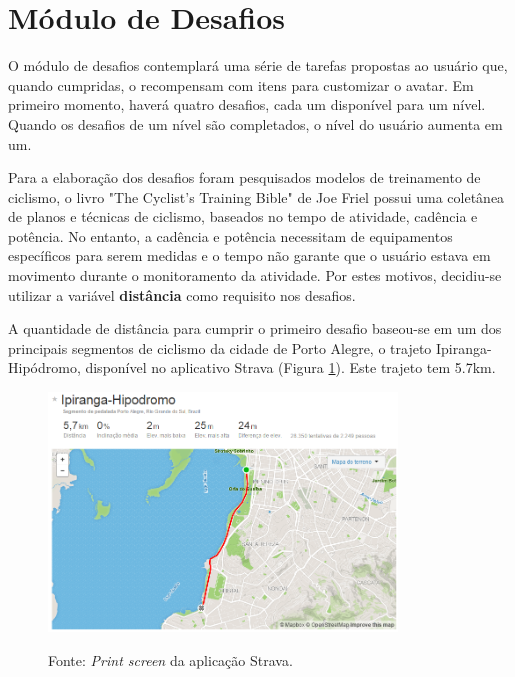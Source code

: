 \section{Módulo de Desafios}
O módulo de desafios contemplará uma série de tarefas propostas ao usuário que, quando cumpridas, o recompensam com itens para customizar o avatar. Em primeiro momento, haverá quatro desafios, cada um disponível para um nível. Quando os desafios de um nível são completados, o nível do usuário aumenta em um.
\par
Para a elaboração dos desafios foram pesquisados modelos de treinamento de ciclismo, o livro "The Cyclist's Training Bible" de Joe Friel\citeyearpar{friel2012cyclist} possui uma coletânea de planos e técnicas de ciclismo, baseados no tempo de atividade, cadência e potência. No entanto, a cadência e potência necessitam de equipamentos específicos para serem medidas e o tempo não garante que o usuário estava em movimento durante o monitoramento da atividade. Por estes motivos, decidiu-se utilizar a variável \textbf{distância} como requisito nos desafios.
\par
A quantidade de distância para cumprir o primeiro desafio baseou-se em um dos principais segmentos de ciclismo da cidade de Porto Alegre, o trajeto Ipiranga-Hipódromo, disponível no aplicativo Strava (Figura \ref{fig:segment}). Este trajeto tem 5.7km.

\begin{figure}[h]
\begin{minipage}{1.0\textwidth}
    \centerline{\includegraphics[width=25em]{figuras/stravaSegment.png}}
    \label{fig:segment}
\end{minipage}
\centerline{Fonte: \textit{Print screen} da aplicação Strava.}
\end{figure}

